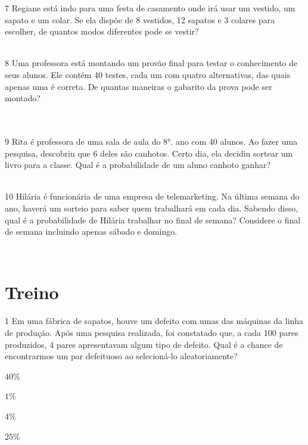 {{{{\num{7} Regiane está indo para uma festa de casamento onde irá usar um
vestido, um sapato e um colar. Se ela dispõe de 8 vestidos, 12 sapatos e
3 colares para escolher, de quantos modos diferentes pode se vestir?

\\

\num{8} Uma professora está montando um provão final para testar o
conhecimento de seus alunos. Ele contém 40 testes, cada um com quatro
alternativas, das quais apenas uma é correta. De quantas maneiras o
gabarito da prova pode ser montado?

\\
\\

\num{9} Rita é professora de uma sala de aula do 8°. ano com 40 alunos. Ao
fazer uma pesquisa, descobriu que 6 deles são canhotos. Certo dia, ela
decidiu sortear um livro para a classe. Qual é a probabilidade de um
aluno canhoto ganhar?

\\

\num{10} Hilária é funcionária de uma empresa de telemarketing. Na última
semana do ano, haverá um sorteio para saber quem trabalhará em cada dia.
Sabendo disso, qual é a probabilidade de Hilária trabalhar no final de
semana? Considere o final de semana incluindo apenas sábado e domingo.

\\

\section*{Treino}

\num{1} Em uma fábrica de sapatos, houve um defeito com umas das máquinas da
linha de produção. Após uma pesquisa realizada, foi constatado que, a
cada 100 pares produzidos, 4 pares apresentavam algum tipo de defeito.
Qual é a chance de encontrarmos um par defeituoso ao selecioná-lo
aleatoriamente?

\begin{escolha}[itemsep=0pt]
\item $40\%$
\item $1\%$
\item $4\%$
\item $25\%$
\end{escolha}

}}}}
